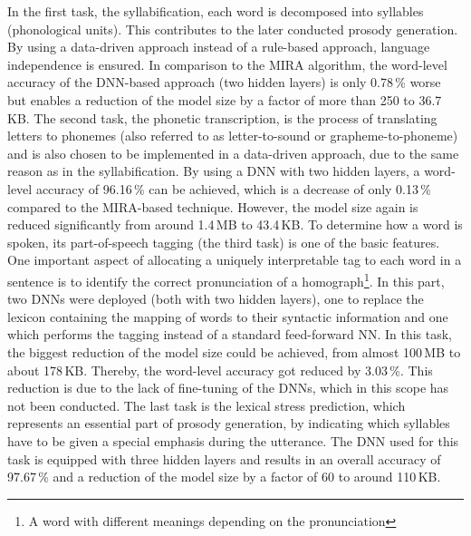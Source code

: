 In the first task, the syllabification, each word is decomposed into syllables (phonological units). This contributes to the later conducted prosody generation. By using a data-driven approach instead of a rule-based approach, language independence is ensured. In comparison to the \ac{MIRA} algorithm, the word-level accuracy of the \ac{DNN}-based approach (two hidden layers) is only 0.78\,\% worse but enables a reduction of the model size by a factor of more than 250 to 36.7\,KB.
The second task, the phonetic transcription, is the process of translating letters to phonemes (also referred to as letter-to-sound or grapheme-to-phoneme) and is also chosen to be implemented in a data-driven approach, due to the same reason as in the syllabification. By using a \ac{DNN} with two hidden layers, a word-level accuracy of 96.16\,\% can be achieved, which is a decrease of only 0.13\,\% compared to the \ac{MIRA}-based technique. However, the model size again is reduced significantly from around 1.4\,MB to 43.4\,KB.
To determine how a word is spoken, its part-of-speech tagging (the third task) is one of the basic features. One important aspect of allocating a uniquely interpretable tag to each word in a sentence is to identify the correct pronunciation of a homograph\footnote{A word with different meanings depending on the pronunciation}. In this part, two \acp{DNN} were deployed (both with two hidden layers), one to replace the lexicon containing the mapping of words to their syntactic information and one which performs the tagging instead of a standard feed-forward \ac{NN}. In this task, the biggest reduction of the model size could be achieved, from almost 100\,MB to about 178\,KB. Thereby, the word-level accuracy got reduced by 3.03\,\%. This reduction is due to the lack of fine-tuning of the \acp{DNN}, which in this scope has not been conducted.
The last task is the lexical stress prediction, which represents an essential part of prosody generation, by indicating which syllables have to be given a special emphasis during the utterance. The \ac{DNN} used for this task is equipped with three hidden layers and results in an overall accuracy of 97.67\,\% and a reduction of the model size by a factor of 60 to around 110\,KB.

